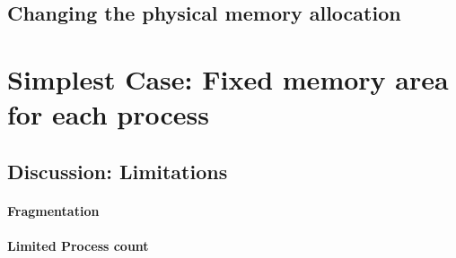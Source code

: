 \subsection*{Changing the physical memory allocation}

\section{Simplest Case: Fixed memory area for each process}
\subsection{Discussion: Limitations}
\paragraph*{Fragmentation}
\paragraph*{Limited Process count}
